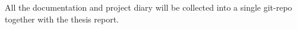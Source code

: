 All the documentation and project diary will be collected into a single git-repo together with the thesis report. 
